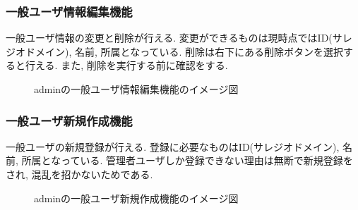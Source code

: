 \documentclass[11ptm]{jsarticle}
\begin{document}
\clearpage
\subsubsection{一般ユーザ情報編集機能}
\label{subsubsec:一般ユーザ情報編集機能}
一般ユーザ情報の変更と削除が行える. 変更ができるものは現時点ではID(サレジオドメイン), 名前, 所属となっている. 削除は右下にある削除ボタンを選択すると行える. また, 削除を実行する前に確認をする. 
\begin{figure}[h]
  \centering
  \caption{\label{fig:adminの一般ユーザ情報編集機能のイメージ図}adminの一般ユーザ情報編集機能のイメージ図}
\end{figure}

\clearpage
\subsubsection{一般ユーザ新規作成機能}
\label{subsubsec:一般ユーザ新規作成機能}
一般ユーザの新規登録が行える. 登録に必要なものはID(サレジオドメイン), 名前, 所属となっている. 管理者ユーザしか登録できない理由は無断で新規登録をされ, 混乱を招かないためである.
\begin{figure}[h]
  \centering
  \caption{\label{fig:adminの一般ユーザ新規作成機能のイメージ図}adminの一般ユーザ新規作成機能のイメージ図}
\end{figure}
\end{document}
